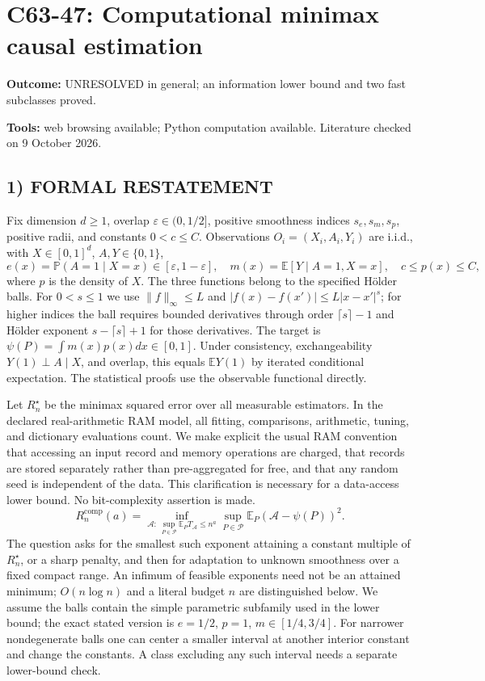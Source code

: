 \documentclass[11pt,a4paper]{article}
\newcommand{\E}{\mathbb E}
\newcommand{\Pp}{\mathbb P}
\theoremstyle{definition}
\begin{document}
\section*{C63-47: Computational minimax causal estimation}
\textbf{Outcome:} UNRESOLVED in general; an information lower bound and two fast subclasses proved.\par\textbf{Tools:} web browsing available; Python computation available. Literature checked on 9 October 2026.
\subsection*{1) FORMAL RESTATEMENT}
Fix dimension $d\ge1$, overlap $\varepsilon\in(0,1/2]$, positive smoothness indices $s_e,s_m,s_p$, positive radii, and constants $0<c\le C$. Observations $O_i=(X_i,A_i,Y_i)$ are i.i.d., with $X\in[0,1]^d$, $A,Y\in\{0,1\}$,
\[
 e(x)=\Pp(A=1\mid X=x)\in[\varepsilon,1-\varepsilon],\quad
 m(x)=\E[Y\mid A=1,X=x],\quad c\le p(x)\le C,
\]
where $p$ is the density of $X$. The three functions belong to the specified H\"older balls. For $0<s\le1$ we use
$\|f\|_\infty\le L$ and $|f(x)-f(x')|\le L|x-x'|^s$; for higher indices the ball requires bounded derivatives through order $\lceil s\rceil-1$ and H\"older exponent $s-\lceil s\rceil+1$ for those derivatives. The target is
$\psi(P)=\int m(x)p(x)dx\in[0,1]$.
Under consistency, exchangeability $Y(1)\perp A\mid X$, and overlap, this equals $\E Y(1)$ by iterated conditional expectation. The statistical proofs use the observable functional directly.

Let $R_n^\star$ be the minimax squared error over all measurable estimators. In the declared real-arithmetic RAM model, all fitting, comparisons, arithmetic, tuning, and dictionary evaluations count. We make explicit the usual RAM convention that accessing an input record and memory operations are charged, that records are stored separately rather than pre-aggregated for free, and that any random seed is independent of the data. This clarification is necessary for a data-access lower bound. No bit-complexity assertion is made.
\[
 R_n^{\mathrm{comp}}(a)=
 \inf_{\mathcal A:\ \sup_{P\in\mathcal P}\E_PT_\mathcal A\le n^a}
       \sup_{P\in\mathcal P}\E_P(\mathcal A-\psi(P))^2.
\]
The question asks for the smallest such exponent attaining a constant multiple of $R_n^\star$, or a sharp penalty, and then for adaptation to unknown smoothness over a fixed compact range. An infimum of feasible exponents need not be an attained minimum; $O(n\log n)$ and a literal budget $n$ are distinguished below. We assume the balls contain the simple parametric subfamily used in the lower bound; the exact stated version is $e=1/2$, $p=1$, $m\in[1/4,3/4]$. For narrower nondegenerate balls one can center a smaller interval at another interior constant and change the constants. A class excluding any such interval needs a separate lower-bound check.
\end{document}
